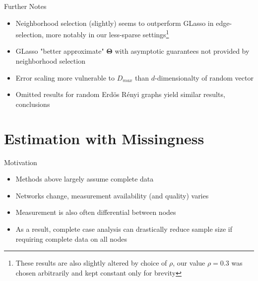 \documentclass{beamer}
\begin{document}
\begin{frame}{Further Notes}
\begin{itemize}\setlength\itemsep{5mm}
    \item Neighborhood selection (slightly) seems to outperform GLasso in edge-selection, more notably in our less-sparse settings\footnote{These results are also slightly altered by choice of $\rho$, our value $\rho=0.3$ was chosen arbitrarily and kept constant only for brevity}
    \item GLasso "better approximate" $\boldsymbol\Theta$ with asymptotic guarantees not provided by neighborhood selection
    \item Error scaling more vulnerable to $D_{max}$ than $d$-dimensionalty of random vector 
    \item Omitted results for random Erd\"os R\'enyi graphs yield similar results, conclusions 
\end{itemize}    
\end{frame}


\section{Estimation with Missingness}

\begin{frame}{Motivation}
    \begin{itemize}\setlength\itemsep{6mm}
        \item Methods above largely assume complete data%
        \item Networks change, measurement availability (and quality) varies
        \item Measurement is also often differential between nodes 
        \item As a result, complete case analysis can drastically reduce sample size if requiring complete data on all nodes 
    \end{itemize}
\end{frame}
\end{document}

